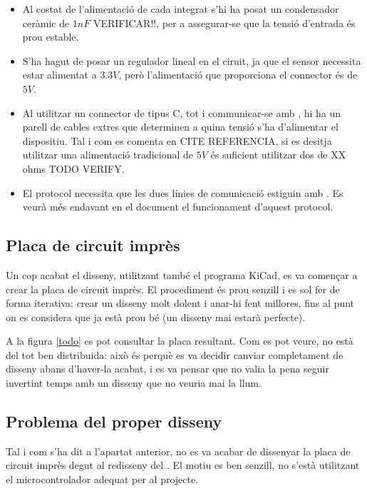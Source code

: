 \begin{itemize}
    \item Al costat de l'alimentació de cada integrat s'hi ha posat un
    condensador ceràmic de $1nF$ VERIFICAR!!, per a assegurar-se que la tensió
    d'entrada és prou estable.
    \item S'ha hagut de posar un regulador lineal en el ciruit, ja que el
    sensor necessita estar alimentat a $3.3V$, però l'alimentació que proporciona
    el connector  és de $5V$.
    \item Al utilitzar un connector de tipus C, tot i communicar-se amb
    , hi ha un parell de cables extres que determinen a quina tensió
    s'ha d'alimentar el dispositiu. Tal i com es comenta en CITE REFERENCIA,
    si es desitja utilitzar una alimentació tradicional de $5V$ és suficient
    utilitzar dos  de XX ohms TODO VERIFY.
    \item El protocol  necessita que les dues línies de comunicació
    estiguin amb . Es veurà més endavant en el document el
    funcionament d'aquest protocol.
\end{itemize}

\subsection{Placa de circuit imprès}

Un cop acabat el disseny, utilitzant també el programa KiCad, es va començar a
crear la placa de circuit imprès. El procediment és prou senzill i es sol fer
de forma iterativa: crear un disseny molt dolent i anar-hi fent millores, fins
al punt on es considera que ja està prou bé (un disseny mai estarà perfecte).

A la figura \ref{todo} es pot consultar la placa resultant. Com es pot veure,
no està del tot ben distribuida: això és perquè es va decidir canviar completament
de disseny abans d'haver-la acabat, i es va pensar que no valia la pena seguir
invertint temps amb un disseny que no veuria mai la llum.

\subsection{Problema del proper disseny}

Tal i com s'ha dit a l'apartat anterior, no es va acabar de dissenyar la placa
de circuit imprès degut al redisseny del . El motiu es ben senzill,
no s'està utilitzant el microcontrolador adequat per al projecte.

